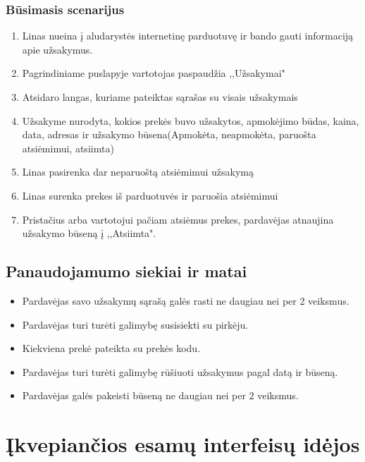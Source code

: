 \documentclass[oneside]{VUMIFPSkursinis}
\begin{document}
		\subsubsection{Būsimasis scenarijus}
				\begin{enumerate}
					\item{Linas nueina į aludarystės internetinę parduotuvę ir bando gauti informaciją apie užsakymus.}
					\item{Pagrindiniame puslapyje vartotojas paspaudžia ,,Užsakymai"}
					\item{Atsidaro langas, kuriame pateiktas sąrašas su visais užsakymais}
					\item{Užsakyme nurodyta, kokios prekės buvo užsakytos, apmokėjimo būdas, kaina, data, adresas ir užsakymo būsena(Apmokėta, neapmokėta, paruošta atsiėmimui, atsiimta)}
					\item{Linas pasirenka dar neparuoštą atsiėmimui užsakymą}
					\item{Linas surenka prekes iš parduotuvės ir paruošia atsiėmimui}
					\item{Pristačius arba vartotojui pačiam atsiėmus prekes, pardavėjas atnaujina užsakymo būseną į ,,Atsiimta".}
					\end{enumerate}
	\subsection{Panaudojamumo siekiai ir matai}
	\begin{itemize}
	\item{Pardavėjas savo užsakymų sąrašą galės rasti ne daugiau nei per 2 veiksmus.}
	\item{Pardavėjas turi turėti galimybę susisiekti su pirkėju.}
	\item{Kiekviena prekė pateikta su prekės kodu.}
	\item{Pardavėjas turi turėti galimybę rūšiuoti užsakymus pagal datą ir būseną.}
	\item{Pardavėjas galės pakeisti būseną ne daugiau nei per 2 veiksmus.}
	\end{itemize}
\section{Įkvepiančios esamų interfeisų idėjos}
\end{document}
